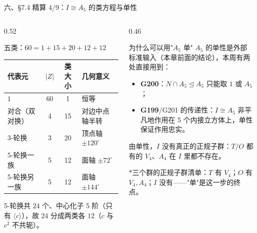 \documentclass[aspectratio=169,10pt,fontset=none]{ctexbeamer}
\newcommand{\ex}[1]{\textcolor{accent}{\footnotesize\bfseries #1}}
\newcommand{\starpt}{\textcolor{accent}{\bfseries$\ast$}}
\begin{document}
\begin{frame}[t]{六、\S7.4 精算 4/9：$I\cong A_5$ 的类方程与单性}
  \begin{columns}[T,onlytextwidth]
    \begin{column}{0.52\textwidth}
      \begin{block}{\footnotesize 五类：$60=1+15+20+12+12$}
        \scriptsize
        \begin{center}
          \renewcommand{\arraystretch}{1.14}
          \begin{tabular}{@{}l c c l@{}}
            \toprule
            代表元 & $|Z|$ & 类大小 & 几何意义\\
            \midrule
            $1$ & 60 & 1 & 恒等\\
            对合（双对换） & 4 & 15 & 对边中点轴半转\\
            3-轮换 & 3 & 20 & 顶点轴 $\pm120^\circ$\\
            5-轮换一族 & 5 & 12 & 面轴 $\pm72^\circ$\\
            5-轮换另一族 & 5 & 12 & 面轴 $\pm144^\circ$\\
            \bottomrule
          \end{tabular}
        \end{center}
        5-轮换共 24 个、中心化子 5 阶（只有 $\langle c\rangle$），故 $24$ 分成两类各 $12$（$c$ 与 $c^2$ 不共轭）。
      \end{block}
    \end{column}
    \begin{column}{0.46\textwidth}
      \begin{block}{\footnotesize 为什么可以用"$A_5$ 单"}
        \scriptsize
        $A_5$ 的单性是外部标准输入（本章前面的结论），本周有两处直接用到：
        \begin{itemize}\setlength{\itemsep}{1pt}
          \item \ex{G200}：$N\cap A_5\trianglelefteq A_5$ 只能取 $1$ 或 $A_5$；
          \item \ex{G199}/G201 的传递性：$I\cong A_5$ 非平凡地作用在 5 个内接立方体上，单性保证作用忠实。
        \end{itemize}
        由单性，$I$ 没有真正的正规子群：$T/O$ 都有的 $V_4$、$A_4$ 在 $I$ 里都不存在。
      \end{block}
      \footnotesize\color{ink!80}
      \starpt 三个群的正规子群清单：$T$ 有 $V_4$；$O$ 有 $V_4,A_4$；$I$ 没有——"单"是这一步的终点。
    \end{column}
  \end{columns}
\end{frame}
\end{document}
